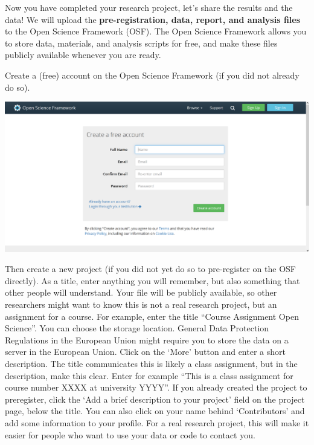 \documentclass[
  oneside]{book}
\begin{document}
Now you have completed your research project, let's share the results and the data! We will upload the \textbf{pre-registration, data, report, and analysis files} to the Open Science Framework (OSF). The Open Science Framework allows you to store data, materials, and analysis scripts for free, and make these files publicly available whenever you are ready.

Create a (free) account on the Open Science Framework (if you did not already do
so).

\begin{center}\includegraphics[width=1\linewidth]{images/7d6b26f83fee88df8bd46f30f4441844} \end{center}

Then create a new project (if you did not yet do so to pre-register on the OSF directly). As a title, enter anything you will remember, but also something that other people will understand. Your file will be publicly available, so other researchers might want to know this is not a real research project, but an assignment for a course. For example, enter the title ``Course Assignment Open Science''. You can choose the storage location. General Data Protection Regulations in the European Union might require you to store the data on a server in the European Union. Click on the `More' button and enter a short description. The title communicates this is likely a class assignment, but in the description, make this clear. Enter for example ``This is a class assignment for course number XXXX at university YYYY''. If you already created the project to preregister, click the `Add a brief description to your project' field on the project page, below the title. You can also click on your name behind `Contributors' and add some information to your profile. For a real research project, this will make it easier for people who want to use your data or code to contact you.
\end{document}
